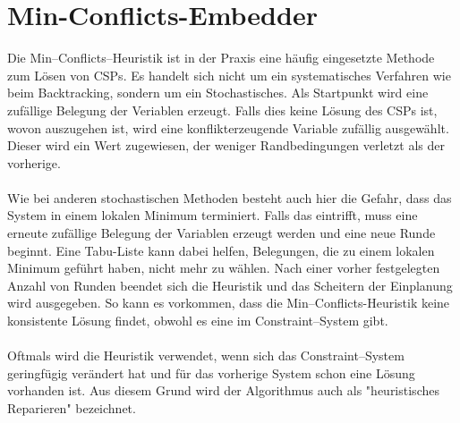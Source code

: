\section{Min-Conflicts-Embedder}\label{minConflicts}
Die Min--Conflicts--Heuristik ist in der Praxis eine häufig eingesetzte Methode zum Lösen von CSPs. Es handelt sich nicht um ein systematisches Verfahren wie beim Backtracking, sondern um ein Stochastisches. Als Startpunkt wird eine zufällige Belegung der Veriablen erzeugt. Falls dies keine Lösung des CSPs ist, wovon auszugehen ist, wird eine konflikterzeugende Variable zufällig ausgewählt. Dieser wird ein Wert zugewiesen, der weniger Randbedingungen verletzt als der vorherige.\\ \\
Wie bei anderen stochastischen Methoden besteht auch hier die Gefahr, dass das System in einem lokalen Minimum terminiert. Falls das eintrifft, muss eine erneute zufällige Belegung der Variablen erzeugt werden und eine neue Runde beginnt. Eine Tabu-Liste kann dabei helfen, Belegungen, die zu einem lokalen Minimum geführt haben, nicht mehr zu wählen. Nach einer vorher festgelegten Anzahl von Runden beendet sich die Heuristik und das Scheitern der Einplanung wird ausgegeben. So kann es vorkommen, dass die Min--Conflicts-Heuristik keine konsistente Lösung findet, obwohl es eine im Constraint--System gibt.\\ \\
Oftmals wird die Heuristik verwendet, wenn sich das Constraint--System geringfügig verändert hat und für das vorherige System schon eine Lösung vorhanden ist. Aus diesem Grund wird der Algorithmus auch als "heuristisches Reparieren" \cite{cspsolvingRepairMethod} bezeichnet.\\ \\
